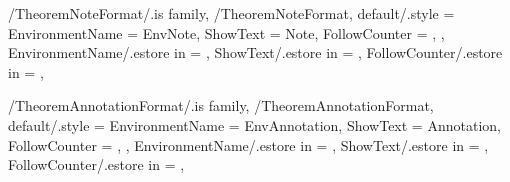 \newcommand{\InitTheoremProofFormat}
{%
  \ifthenelse{\equal{\GetTheoremProofFormatFollowCounter}{\empty}}%
  {%
    \newtheorem*{%
      \GetTheoremProofFormatEnvironmentName}{%
      \GetTheoremProofFormatShowText}
  }%
  {%
    \newtheorem{%
      \GetTheoremProofFormatEnvironmentName}{%
      \GetTheoremProofFormatShowText}[%
      \GetTheoremProofFormatFollowCounter]%
  }%
} %


\pgfkeys
{
  /TheoremNoteFormat/.is family, /TheoremNoteFormat,
  default/.style =
  {
    EnvironmentName = {EnvNote},
    ShowText = {Note},
    FollowCounter = \empty,
  },
  EnvironmentName/.estore in = \GetTheoremNoteFormatEnvironmentName,
  ShowText/.estore in = \GetTheoremNoteFormatShowText,
  FollowCounter/.estore in = \GetTheoremNoteFormatFollowCounter,
} %

\newcommand{\InsertNote}[1]
{%
  \InsertTheoremContent[\empty]{%
    \GetTheoremNoteFormatEnvironmentName}{#1}%
} %

\newcommand{\InitTheoremNoteFormat}
{%
  \ifthenelse{\equal{\GetTheoremNoteFormatFollowCounter}{\empty}}%
  {%
    \newtheorem*{%
      \GetTheoremNoteFormatEnvironmentName}{%
      \GetTheoremNoteFormatShowText}
  }%
  {%
    \newtheorem{%
      \GetTheoremNoteFormatEnvironmentName}{%
      \GetTheoremNoteFormatShowText}[%
      \GetTheoremNoteFormatFollowCounter]%
  }%
} %


\pgfkeys
{
  /TheoremAnnotationFormat/.is family, /TheoremAnnotationFormat,
  default/.style =
  {
    EnvironmentName = {EnvAnnotation},
    ShowText = {Annotation},
    FollowCounter = \empty,
  },
  EnvironmentName/.estore in = \GetTheoremAnnotationFormatEnvironmentName,
  ShowText/.estore in = \GetTheoremAnnotationFormatShowText,
  FollowCounter/.estore in = \GetTheoremAnnotationFormatFollowCounter,
} %

\newcommand{\InsertAnnotation}[1]
{%
  \InsertTheoremContent[\empty]{%
    \GetTheoremAnnotationFormatEnvironmentName}{#1}%
} %

\newcommand{\InitTheoremAnnotationFormat}
{%
  \ifthenelse{\equal{\GetTheoremAnnotationFormatFollowCounter}{\empty}}%
  {%
    \newtheorem*{%
      \GetTheoremAnnotationFormatEnvironmentName}{%
      \GetTheoremAnnotationFormatShowText}
  }%
  {%
    \newtheorem{%
      \GetTheoremAnnotationFormatEnvironmentName}{%
      \GetTheoremAnnotationFormatShowText}[%
      \GetTheoremAnnotationFormatFollowCounter]%
  }%
} %

